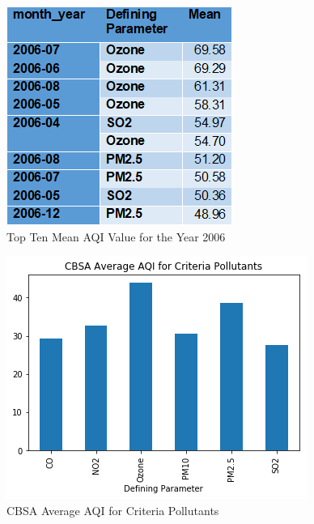 \documentclass[sigconf]{acmart}
\begin{document}
\begin{figure}[htb]
\includegraphics[width=1.0\columnwidth]{images/top10meanaqi2006.png}
  \caption{Top Ten Mean AQI Value for the Year 2006}
  \label{Top Ten Mean AQI Value for Year 2006}
\end{figure}


\begin{figure}[htb]
\includegraphics[width=1.0\columnwidth]{images/averageaqi2016.png}
  \caption{CBSA Average AQI for Criteria Pollutants}
  \label{Average CBSA AQI 2016}
\end{figure}
\end{document}
